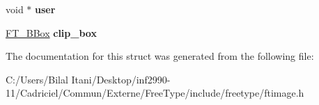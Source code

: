 \begin{DoxyCompactItemize}
\item 
void $\ast$ {\bfseries user}\hypertarget{struct_f_t___raster___params___af78bac59f93c989840bbcbcbefd77c55}{}\label{struct_f_t___raster___params___af78bac59f93c989840bbcbcbefd77c55}

\item 
\hyperlink{struct_f_t___b_box__}{F\+T\+\_\+\+B\+Box} {\bfseries clip\+\_\+box}\hypertarget{struct_f_t___raster___params___ab32f75f19d9cacb20e410886c055e306}{}\label{struct_f_t___raster___params___ab32f75f19d9cacb20e410886c055e306}

\end{DoxyCompactItemize}


The documentation for this struct was generated from the following file\+:\begin{DoxyCompactItemize}
\item 
C\+:/\+Users/\+Bilal Itani/\+Desktop/inf2990-\/11/\+Cadriciel/\+Commun/\+Externe/\+Free\+Type/include/freetype/ftimage.\+h\end{DoxyCompactItemize}
